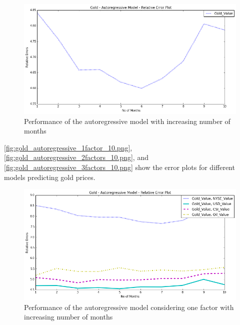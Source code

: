 \documentclass[runningheads]{llncs}
\begin{document}
\begin{figure}
\centering
\includegraphics[width=\textwidth]{gold_autoregressive.png}
\caption{Performance of the autoregressive model with increasing number of months}
\label{fig:gold_autoregressive.png}
\end{figure}

\noindent \autoref{fig:gold_autoregressive_1factor_10.png}, \autoref{fig:gold_autoregressive_2factors_10.png}, and \autoref{fig:gold_autoregressive_3factors_10.png} show the error plots for different models predicting gold prices. 

\begin{figure}
\centering
\includegraphics[width=\textwidth]{gold_autoregressive_1factor_10.png}
\caption{Performance of the autoregressive model considering one factor with increasing number of months}
\label{fig:gold_autoregressive_1factor_10.png}
\end{figure}
\end{document}

